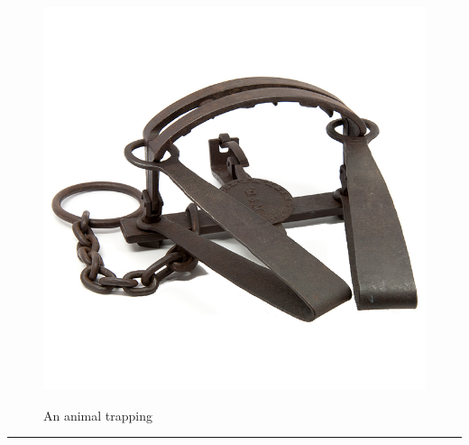 \documentclass{article}
\begin{document}
    \begin{figure}[H]
        \centering
        \begin{minipage}{0.25\textwidth}
            \centering
            \includegraphics[width=\textwidth]{../SurvivalItemImages/trap}
        \end{minipage}\hfill
        \begin{minipage}{0.7\textwidth}
            \centering
            \Large An animal trapping
        \end{minipage}
    \end{figure}
    \vspace{-0.8em}
    \noindent\rule{\textwidth}{0.4pt}
            
\end{document}
